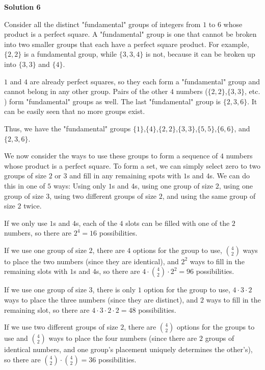 \begin{enumerate}
 



\textbf{Solution 6}

Consider all the distinct "fundamental" groups of integers from $1$ to $6$ whose product is a perfect square. A "fundamental" group is one that cannot be broken into two smaller groups that each have a perfect square product. For example, $\{2,2\}$ is a fundamental group, while $\{3,3,4\}$ is not, because it can be broken up into $\{3,3\}$ and $\{4\}$.

 $1$ and $4$ are already perfect squares, so they each form a "fundamental" group and cannot belong in any other group. Pairs of the other $4$ numbers ($\{2,2\}$,$\{3,3\}$, etc. ) form "fundamental" groups as well. The last "fundamental" group is $\{2,3,6\}$. It can be easily seen that no more groups exist.

 Thus, we have the "fundamental" groups $\{1\}$,$\{4\}$,$\{2,2\}$,$\{3,3\}$,$\{5,5\}$,$\{6,6\}$, and $\{2,3,6\}$.

 We now consider the ways to use these groups to form a sequence of $4$ numbers whose product is a perfect square. To form a set, we can simply select zero to two groups of size $2$ or $3$ and fill in any remaining spots with $1$s and $4$s. We can do this in one of $5$ ways: Using only $1$s and $4$s, using one group of size $2$, using one group of size $3$, using two different groups of size $2$, and using the same group of size $2$ twice.

 If we only use $1$s and $4$s, each of the $4$ slots can be filled with one of the $2$ numbers, so there are $2^4=16$ possibilities.

 If we use one group of size $2$, there are $4$ options for the group to use, $\binom{4}{2}$ ways to place the two numbers (since they are identical), and $2^2$ ways to fill in the remaining slots with $1$s and $4$s, so there are $4\cdot\binom{4}{2}\cdot2^2=96$ possibilities.

 If we use one group of size $3$, there is only $1$ option for the group to use, $4\cdot3\cdot2$ ways to place the three numbers (since they are distinct), and $2$ ways to fill in the remaining slot, so there are $4\cdot3\cdot2\cdot2=48$ possibilities.

 If we use two different groups of size $2$, there are $\binom{4}{2}$ options for the groups to use and $\binom{4}{2}$ ways to place the four numbers (since there are $2$ groups of identical numbers, and one group's placement uniquely determines the other's), so there are $\binom{4}{2}\cdot\binom{4}{2}=36$ possibilities.


\end{enumerate}
